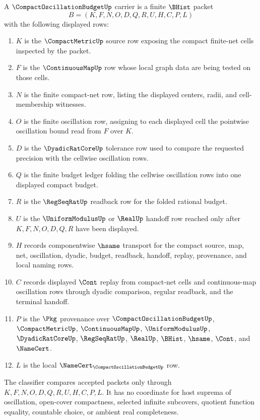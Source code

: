 \begin{definition}
\label{def:compact-oscillation-budget-carrier}
A $\CompactOscillationBudgetUp$ carrier is a finite $\BHist$ packet
$$
B=(K,F,N,O,D,Q,R,U,H,C,P,L)
$$
with the following displayed rows:
\begin{enumerate}
\item $K$ is the $\CompactMetricUp$ source row exposing the compact finite-net cells inspected by the packet.
\item $F$ is the $\ContinuousMapUp$ row whose local graph data are being tested on those cells.
\item $N$ is the finite compact-net row, listing the displayed centers, radii, and cell-membership witnesses.
\item $O$ is the finite oscillation row, assigning to each displayed cell the pointwise oscillation bound read from $F$ over $K$.
\item $D$ is the $\DyadicRatCoreUp$ tolerance row used to compare the requested precision with the cellwise oscillation rows.
\item $Q$ is the finite budget ledger folding the cellwise oscillation rows into one displayed compact budget.
\item $R$ is the $\RegSeqRatUp$ readback row for the folded rational budget.
\item $U$ is the $\UniformModulusUp$ or $\RealUp$ handoff row reached only after $K,F,N,O,D,Q,R$ have been displayed.
\item $H$ records componentwise $\hsame$ transport for the compact source, map, net, oscillation, dyadic, budget, readback, handoff, replay, provenance, and local naming rows.
\item $C$ records displayed $\Cont$ replay from compact-net cells and continuous-map oscillation rows through dyadic comparison, regular readback, and the terminal handoff.
\item $P$ is the $\Pkg$ provenance over $\CompactOscillationBudgetUp$, $\CompactMetricUp$, $\ContinuousMapUp$, $\UniformModulusUp$, $\DyadicRatCoreUp$, $\RegSeqRatUp$, $\RealUp$, $\BHist$, $\hsame$, $\Cont$, and $\NameCert$.
\item $L$ is the local $\NameCert_{\CompactOscillationBudgetUp}$ row.
\end{enumerate}
The classifier compares accepted packets only through $K,F,N,O,D,Q,R,U,H,C,P,L$. It has no coordinate for host suprema of oscillation, open-cover compactness, selected infinite subcovers, quotient function equality, countable choice, or ambient real completeness.
\end{definition}


